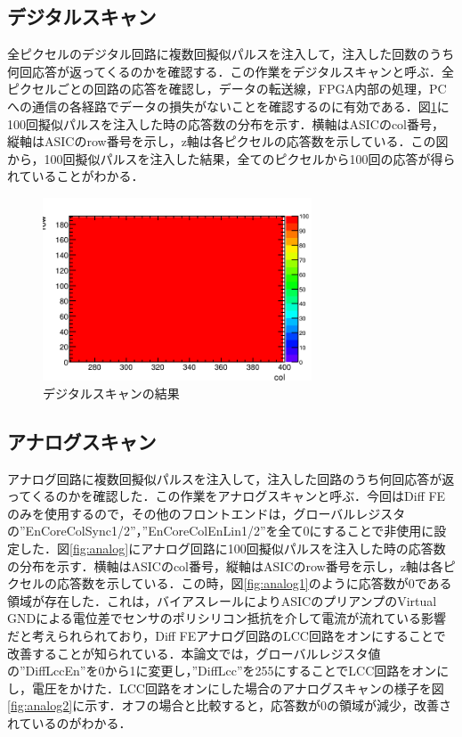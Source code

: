 \subsection{デジタルスキャン}
全ピクセルのデジタル回路に複数回擬似パルスを注入して，注入した回数のうち何回応答が返ってくるのかを確認する．この作業をデジタルスキャンと呼ぶ．全ピクセルごとの回路の応答を確認し，データの転送線，FPGA内部の処理，PCへの通信の各経路でデータの損失がないことを確認するのに有効である．図\ref{fig:digital}に100回擬似パルスを注入した時の応答数の分布を示す．横軸はASICのcol番号，縦軸はASICのrow番号を示し，z軸は各ピクセルの応答数を示している．この図から，100回擬似パルスを注入した結果，全てのピクセルから100回の応答が得られていることがわかる．
\begin{figure}[h]
  \centering
  \includegraphics[width=8cm]{./figure/DigitalScan.png}
  \caption{デジタルスキャンの結果}
  \label{fig:digital}
\end{figure}


\subsection{アナログスキャン}
アナログ回路に複数回擬似パルスを注入して，注入した回路のうち何回応答が返ってくるのかを確認した．この作業をアナログスキャンと呼ぶ．今回はDiff FEのみを使用するので，その他のフロントエンドは，グローバルレジスタの''EnCoreColSync1/2''，''EnCoreColEnLin1/2''を全て0にすることで非使用に設定した．図\ref{fig:analog}にアナログ回路に100回擬似パルスを注入した時の応答数の分布を示す．横軸はASICのcol番号，縦軸はASICのrow番号を示し，z軸は各ピクセルの応答数を示している．この時，図\ref{fig:analog1}のように応答数が0である領域が存在した．これは，バイアスレールによりASICのプリアンプのVirtual GNDによる電位差でセンサのポリシリコン抵抗を介して電流が流れている影響だと考えられられており，Diff FEアナログ回路のLCC回路をオンにすることで改善することが知られている．\cite{uchiyama}本論文では，グローバルレジスタ値の''DiffLccEn''を0から1に変更し，''DiffLcc''を255にすることでLCC回路をオンにし，電圧をかけた．LCC回路をオンにした場合のアナログスキャンの様子を図\ref{fig:analog2}に示す．オフの場合と比較すると，応答数が0の領域が減少，改善されているのがわかる．

